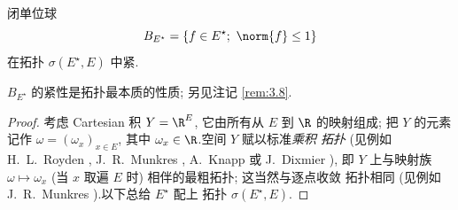 \begin{keytheorem}
\label{thm:3.16}
闭单位球
\begin{equation*}
B_{E^\star}=\{f\in E^\star;\ \norm{f}\le1\}
\end{equation*}
在\wstar{}拓扑 $\sigma(E^\star,E)$ 中紧.
\end{keytheorem}

\begin{remark}
\label{rem:3.12}
$B_{E^\star}$ 的紧性是\wstar{}拓扑最本质的性质; 另见注记 \ref{rem:3.8}.
\end{remark}

\begin{proof}
考虑 Cartesian 积 $Y=\R^E$, 它由所有从 $E$ 到 $\R$ 的映射组成; 把 $Y$ 的元素记作
$\omega=(\omega_x)_{x\in E}$, 其中 $\omega_x\in\R$.空间 $Y$ 赋以标准\emph{乘积
拓扑} (见例如 H.~L.~Royden , J.~R.~Munkres , A.~Knapp  或 J.~Dixmier ), 即 $Y$ 上与映射族
$\omega\mapsto\omega_x$ (当 $x$ 取遍 $E$ 时) 相伴的最粗拓扑; 这当然与逐点收敛
拓扑相同 (见例如 J.~R.~Munkres ).以下总给 $E^\star$ 配上
\wstar{}拓扑 $\sigma(E^\star,E)$.


\end{proof}
